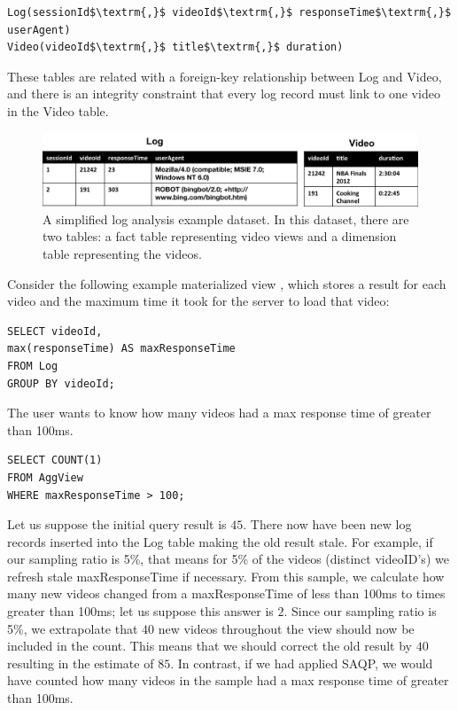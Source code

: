 \begin{lstlisting}[mathescape]
Log(sessionId$\textrm{,}$ videoId$\textrm{,}$ responseTime$\textrm{,}$ userAgent)
Video(videoId$\textrm{,}$ title$\textrm{,}$ duration)
\end{lstlisting}
These tables are related with a foreign-key relationship between
Log and Video, and there is an integrity constraint that every log
record must link to one video in the Video table.

\begin{figure}[ht!] 
\centering
\vspace{-0.75em}
 \includegraphics[width=\columnwidth]{figs/sample-clean-example.png}\vspace{-0.25em}
 \caption{A simplified log analysis example dataset. In this dataset, there are two tables: a fact table representing video views and a dimension table representing the videos.\label{example-1}}
\end{figure}

Consider the following example materialized view \aggview, which stores a result for each video and the maximum time it took for the server to load that video:
\begin{lstlisting} 
SELECT videoId, 
max(responseTime) AS maxResponseTime 
FROM Log 
GROUP BY videoId;
\end{lstlisting}

The user wants to know how many videos had a max response time of greater than 100ms.
\begin{lstlisting} 
SELECT COUNT(1)
FROM AggView
WHERE maxResponseTime > 100;
\end{lstlisting}
Let us suppose the initial query result is $45$.
There now have been new log records inserted into the Log table making the old result stale.
For example, if our sampling ratio is 5\%, that means for 5\% of the videos (distinct videoID's) we refresh stale maxResponseTime if necessary.
From this sample, we calculate how many new videos changed from a maxResponseTime of less than 100ms to times greater than 100ms; let us suppose this answer is $2$.
Since our sampling ratio is 5\%, we extrapolate that $40$ new videos throughout the view should now be included in the count.
This means that we should correct the old result by $40$ resulting in the estimate of $85$.
In contrast, if we had applied SAQP, we would have counted how many videos in the sample had a max response time of greater than 100ms.
